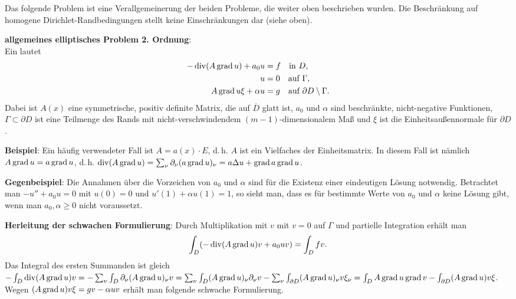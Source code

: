 Das folgende Problem ist eine Verallgemeinerung der beiden Probleme, die weiter oben
beschrieben wurden.
Die Beschränkung auf homogene Dirichlet-Randbedingungen stellt keine Einschränkungen dar
(siehe oben).

\textbf{allgemeines elliptisches Problem 2. Ordnung}:\\
Ein  lautet
\begin{align*}
    -\operatorname{div}(A \operatorname{grad} u) + a_0 u &= f \quad\text{in } D,\\
    u &= 0 \quad\text{auf } \Gamma,\\
    A \operatorname{grad} u \xi + \alpha u &= g \quad\text{auf } \partial D \setminus \Gamma.
\end{align*}
Dabei ist $A(x)$ eine symmetrische, positiv definite Matrix, die auf $\overline{D}$ glatt ist,
$a_0$ und $\alpha$ sind beschränkte, nicht-negative Funktionen, $\Gamma \subset \partial D$ ist
eine Teilmenge des Rands mit nicht-verschwindendem $(m - 1)$-dimensionalem Maß und
$\xi$ ist die Einheitsaußennormale für $\partial D$.

\linie

\textbf{Beispiel}:
Ein häufig verwendeter Fall ist $A = a(x) \cdot E$, d.\,h. $A$ ist ein Vielfaches der
Einheitsmatrix.
In diesem Fall ist nämlich $A \operatorname{grad} u = a \operatorname{grad} u$,
d.\,h. $\operatorname{div}(A \operatorname{grad} u) = \sum_\nu \partial_\nu (a \operatorname{grad} u)_\nu =
a \Delta u + \operatorname{grad} a \operatorname{grad} u$.

\textbf{Gegenbeispiel}:
Die Annahmen über die Vorzeichen von $a_0$ und $\alpha$ sind für die Existenz einer eindeutigen
Lösung notwendig.
Betrachtet man $-u'' + a_0 u = 0$ mit $u(0) = 0$ und $u'(1) + \alpha u(1) = 1$,
so sieht man, dass es für bestimmte Werte von $a_0$ und $\alpha$ keine Lösung gibt,
wenn man $a_0, \alpha \ge 0$ nicht voraussetzt.

\linie

\textbf{Herleitung der schwachen Formulierung}:
Durch Multiplikation mit $v$ mit $v = 0$ auf $\Gamma$ und partielle Integration erhält man
\begin{align*}
    \int_D (-\operatorname{div}(A \operatorname{grad} u)v + a_0 u v) = \int_D fv.
\end{align*}
Das Integral des ersten Summanden ist gleich
$-\int_D \operatorname{div}(A \operatorname{grad} u) v
= -\sum_\nu \int_D \partial_\nu (A \operatorname{grad} u)_\nu v
= \sum_\nu \int_D (A \operatorname{grad} u)_\nu \partial_\nu v -
\sum_\nu \int_{\partial D} (A \operatorname{grad} u)_\nu v \xi_\nu
= \int_D A \operatorname{grad} u \operatorname{grad} v - \int_{\partial D} (A \operatorname{grad} u) v \xi$.\\
Wegen $(A \operatorname{grad} u) v \xi = gv - \alpha uv$ erhält man folgende schwache Formulierung.

